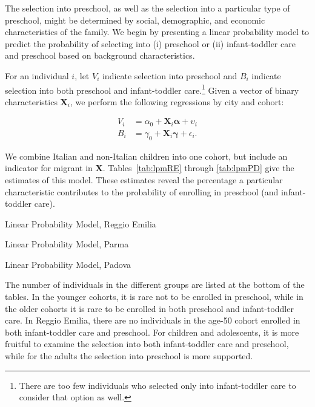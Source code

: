 The selection into preschool, as well as the selection into a particular type of preschool, might be determined by social, demographic, and economic characteristics of the family. We begin by presenting a linear probability model to predict the probability of selecting into (i) preschool or (ii) infant-toddler care and preschool based on background characteristics.

For an individual $i$, let $V_i$ indicate selection into preschool and $B_i$ indicate selection into both preschool and infant-toddler care.\footnote{There are too few individuals who selected only into infant-toddler care to consider that option as well.} Given a vector of binary characteristics $\mathbf{X}_i$, we perform the following regressions by city and cohort:

\begin{align}
	V_i &= \alpha_0 + \mathbf{X}_i\bm{\alpha} + \upsilon_i \label{eq:lpm-v} \\
	B_i &= \gamma_0 + \mathbf{X}_i\bm{\gamma} + \epsilon_i. \label{eq:lpm-b}
\end{align}

We combine Italian and non-Italian children into one cohort, but include an indicator for migrant in $\mathbf{X}$. Tables~\ref{tab:lpmRE} through \ref{tab:lpmPD} give the estimates of this model. These estimates reveal the percentage a particular characteristic contributes to the probability of enrolling in preschool (and infant-toddler care). 

\begin{table}
	\caption{Linear Probability Model, Reggio Emilia}\label{tab:lpmRE}
	\centering
	\footnotesize
		
\end{table}

\begin{table}
	\caption{Linear Probability Model, Parma}\label{tab:lpmPR}
	\centering
	\footnotesize
		
\end{table}

\begin{table}
	\caption{Linear Probability Model, Padova}\label{tab:lpmPD}
	\centering
	\footnotesize
		
\end{table}

The number of individuals in the different groups are listed at the bottom of the tables. In the younger cohorts, it is rare not to be enrolled in preschool, while in the older cohorts it is rare to be enrolled in both preschool and infant-toddler care. In Reggio Emilia, there are no individuals in the age-50 cohort enrolled in both infant-toddler care and preschool. For children and adolescents, it is more fruitful to examine the selection into both infant-toddler care and preschool, while for the adults the selection into preschool is more supported.

